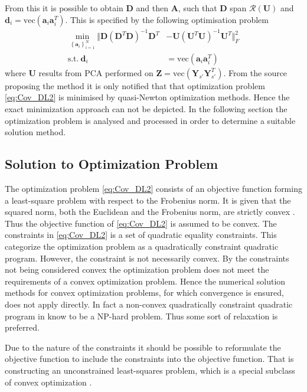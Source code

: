 From this it is possible to obtain $\textbf{D}$ and then $\textbf{A}$, such that $\textbf{D}$ span $\mathcal{R}(\textbf{U})$ and $\textbf{d}_i = \text{vec}(\textbf{a}_i\textbf{a}_i^T)$. This is specified by the following optimisation problem \cite{Balkan2015}
\begin{align}
\min_{\left\{\textbf{a}_i\right\}_{i = 1}^{N}}\Vert  \textbf{D}(\textbf{D}^T\textbf{D})^{-1}\textbf{D}^T &- \textbf{U}(\textbf{U}^T\textbf{U})^{-1}\textbf{U}^T \Vert_{F}^{2} \nonumber \\
\text{s.t.} \ \textbf{d}_i&=\text{vec}(\textbf{a}_i\textbf{a}_i^T)\label{eq:Cov_DL2}
\end{align}      
where $\textbf{U}$ results from PCA performed on $\textbf{Z} = \text{vec}\left( \mathbf{Y}_{s'} \mathbf{Y}_{s'}^T \right)$.
From the source \cite{Balkan2015} proposing the method it is only notified that that optimization problem \eqref{eq:Cov_DL2} is minimised by quasi-Newton optimization methods. Hence the exact minimization approach can not be depicted.    
In the following section the optimization problem is analysed and processed in order to determine a suitable solution method. 
 
\subsection{Solution to Optimization Problem}
The optimization problem \eqref{eq:Cov_DL2} consists of an objective function forming a least-square problem with respect to the Frobenius norm. It is given that the squared norm, both the Euclidean and the Frobenius norm, are strictly convex \cite[p.173]{norm_optimization}.
Thus the objective function of \eqref{eq:Cov_DL2} is assumed to be convex.
The constraints in \eqref{eq:Cov_DL2} is a set of quadratic equality constraints. 
This categorize the optimization problem as a quadratically constraint quadratic program. 
However, the constraint is not necessarily convex.  
By the constraints not being considered convex the optimization problem does not meet the requirements of a convex optimization problem. Hence the numerical solution methods for convex optimization problems, for which convergence is ensured, does not apply directly. In fact a non-convex quadratically constraint quadratic program in know to be a NP-hard problem\cite{qcqp}. Thus some sort of relaxation is preferred.  

Due to the nature of the constraints it should be possible to reformulate the objective function to include the constraints into the objective function. That is constructing an unconstrained least-squares problem, which is a special subclass of convex optimization \cite{cvxbook}.

